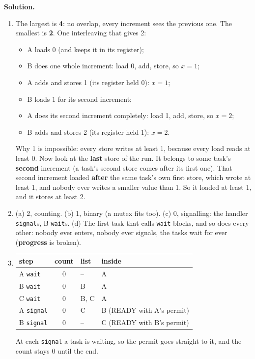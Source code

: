 \textbf{Solution.}
\begin{enumerate}
    \item The largest is \textbf{4}: no overlap, every increment sees the previous one. The smallest is \textbf{2}. One interleaving that gives 2:
    \begin{itemize}
        \item A loads 0 (and keeps it in its register);
        \item B does one whole increment: load 0, add, store, so $x = 1$;
        \item A adds and stores 1 (its register held 0): $x = 1$;
        \item B loads 1 for its second increment;
        \item A does its second increment completely: load 1, add, store, so $x = 2$;
        \item B adds and stores 2 (its register held 1): $x = 2$.
    \end{itemize}
    Why 1 is impossible: every store writes at least 1, because every load reads at least 0. Now look at the \textbf{last} store of the run. It belongs to some task's \textbf{second} increment (a task's second store comes after its first one). That second increment loaded \textbf{after} the same task's own first store, which wrote at least 1, and nobody ever writes a smaller value than 1. So it loaded at least 1, and it stores at least 2.
    \item (a) 2, counting. (b) 1, binary (a mutex fits too). (c) 0, signalling: the handler \texttt{signal}s, B \texttt{wait}s. (d) The first task that calls \texttt{wait} blocks, and so does every other: nobody ever enters, nobody ever signals, the tasks wait for ever (\textbf{progress} is broken).
    \item
    \begin{tabular}[t]{l c l l}
        \hline
        \textbf{step} & \textbf{count} & \textbf{list} & \textbf{inside} \\
        \hline
        A \texttt{wait} & 0 & -- & A \\
        B \texttt{wait} & 0 & B & A \\
        C \texttt{wait} & 0 & B, C & A \\
        A \texttt{signal} & 0 & C & B (READY with A's permit) \\
        B \texttt{signal} & 0 & -- & C (READY with B's permit) \\
        \hline
    \end{tabular}

    At each \texttt{signal} a task is waiting, so the permit goes straight to it, and the count stays 0 until the end.
\end{enumerate}

